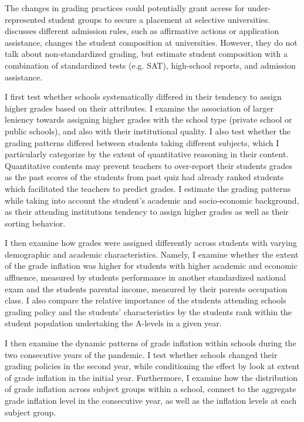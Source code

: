 The changes in grading practices could potentially grant access for under-represented student groups to secure a placement at selective universities.  \cite{Chetty2023} \cite{Arcidiacono2005}\cite{Epple2005} discusses different admission rules, such as affirmative actions or application assistance, changes the student composition at universities. However, they do not talk about non-standardized grading, but estimate student composition with a combination of standardized tests (e.g. SAT), high-school reports, and admission assistance. 

I first test whether schools systematically differed in their tendency to assign higher grades based on their attributes. I examine the association of larger leniency towards assigning higher grades with the school type (private school or public schools), and also with their institutional quality. I also test whether the grading patterns differed between students taking different subjects, which I particularly categorize by the extent of quantitative reasoning in their content. Quantitative contents may prevent teachers to over-report their students grades as the past scores of the students from past quiz had already ranked students which facilitated the teachers to predict grades. I estimate the grading patterns while taking into account the student's academic and socio-economic background, as their attending institutions tendency to assign higher grades as well as their sorting behavior.

I then examine how grades were assigned differently across students with varying demographic and academic characteristics. Namely, I examine whether the extent of the grade inflation was higher for students with higher academic and economic affluence, measured by students performance in another standardized national exam and the students parental income, measured by their parents occupation class. I also compare the relative importance of the students attending schools grading policy and the students' characteristics by the students rank within the student population undertaking the A-levels in a given year. 

I then examine the dynamic patterns of grade inflation within schools during the two consecutive years of the pandemic. I test whether schools changed their grading policies in the second year, while conditioning the effect by look at extent of grade inflation in the initial year. Furthermore, I examine how the distribution of grade inflation across subject groups within a school, connect to the aggregate grade inflation level in the consecutive year, as well as the inflation levels at each subject group. 

